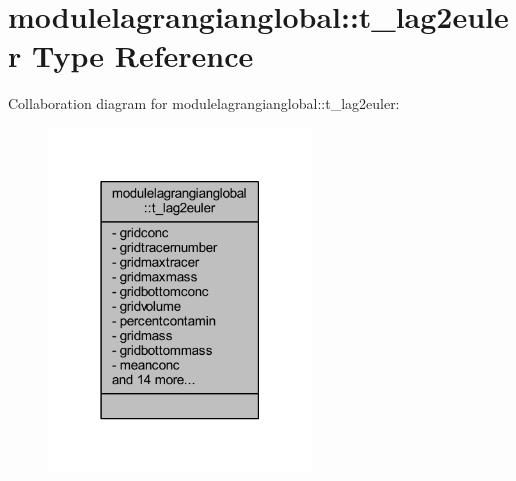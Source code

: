 \hypertarget{structmodulelagrangianglobal_1_1t__lag2euler}{}\section{modulelagrangianglobal\+:\+:t\+\_\+lag2euler Type Reference}
\label{structmodulelagrangianglobal_1_1t__lag2euler}


Collaboration diagram for modulelagrangianglobal\+:\+:t\+\_\+lag2euler\+:\nopagebreak
\begin{figure}[H]
\begin{center}
\leavevmode
\includegraphics[width=198pt]{structmodulelagrangianglobal_1_1t__lag2euler__coll__graph}
\end{center}
\end{figure}
